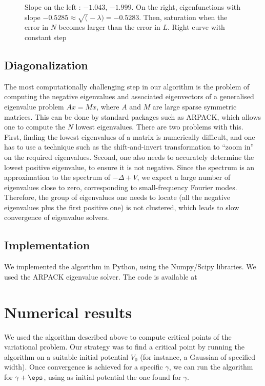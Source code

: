 \documentclass[10pt,a4paper,reqno]{amsart}
\begin{document}
\begin{figure}[H]
  \centering
  \caption{Slope on the left : $-1.043$, $-1.999$. On the right, eigenfunctions
    with slope $- 0.5285 \approx \sqrt(-\lambda) = -0.5283$. Then, saturation when
    the error in $N$ becomes larger than the error in $L$. Right curve
  with constant step}
  \label{fig:conv_NL}
\end{figure}

\subsection{Diagonalization}
The most computationally challenging step in our algorithm is the
problem of computing the negative eigenvalues and associated
eigenvectors of a generalised eigenvalue problem $A x = M x$, where
$A$ and $M$ are large sparse symmetric matrices. This can be done by
standard packages such as ARPACK\cite{lehoucq1998arpack}, which allows
one to compute the $N$ lowest eigenvalues. There are two problems with
this. First, finding the lowest eigenvalues of a matrix is numerically
difficult, and one has to use a technique such as the shift-and-invert
transformation to ``zoom in'' on the required eigenvalues. Second, one
also needs to accurately determine the lowest positive eigenvalue, to
ensure it is not negative. Since the spectrum is an approximation to
the spectrum of $-\Delta + V$, we expect a large number of eigenvalues
close to zero, corresponding to small-frequency Fourier
modes. Therefore, the group of eigenvalues one needs to locate (all
the negative eigenvalues plus the first positive one) is not
clustered, which leads to slow convergence of eigenvalue solvers.

\subsection{Implementation}
We implemented the algorithm in Python, using the Numpy/Scipy
libraries\cite{scipy}. We used the ARPACK eigenvalue
solver\cite{lehoucq1998arpack}. The code is available at
\section{Numerical results}
\label{numres}
We used the algorithm described above to compute critical points of
the variational problem. Our strategy was to find a critical point by
running the algorithm on a suitable initial potential $V_{0}$ (for
instance, a Gaussian of specified width). Once convergence is achieved
for a specific $\gamma$, we can run the algorithm for $\gamma + \eps$,
using as initial potential the one found for $\gamma$.
\end{document}
